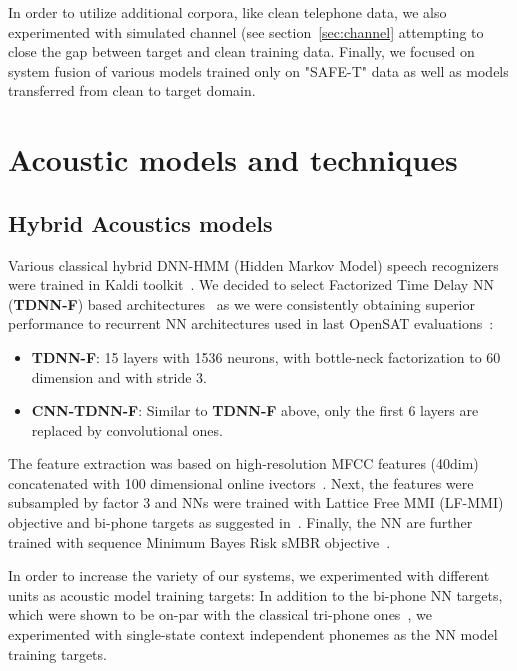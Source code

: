 \documentclass{article}
\begin{document}
In order to utilize additional corpora, like clean telephone data, we  
also experimented with simulated channel (see section~\ref{sec:channel} attempting to close  the  gap
between target and clean training data. Finally, we focused on system fusion of various models trained only on "SAFE-T" data as well as models transferred from clean to target domain.




\section{Acoustic models and techniques}
\label{sec:AM}

\subsection{Hybrid Acoustics models}
Various classical hybrid DNN-HMM (Hidden Markov Model) speech recognizers were trained in Kaldi
toolkit~\cite{povey:ASRU:2011:Kaldi}. We decided to select Factorized
Time Delay NN ({\bf TDNN-F}) based
architectures~\cite{povey:IS:2018:TDNN-F} as we were consistently
obtaining superior performance to recurrent NN architectures used in last OpenSAT evaluations~\cite{karafiat:IS:2018:OpenSAT}:
\begin{itemize}
\item {\bf TDNN-F}: 15 layers with 1536 neurons, with bottle-neck factorization to 60 dimension and with stride 3.
\item {\bf CNN-TDNN-F}: Similar to {\bf TDNN-F} above, only the first 6 layers are replaced by convolutional ones.
\end{itemize}

The feature extraction was based on high-resolution MFCC features (40dim)
concatenated with 100 dimensional online
ivectors~\cite{peddinti:IS:2015:ivec-aspire-online}.
Next, the features were subsampled by factor 3 and NNs were trained with
Lattice Free MMI (LF-MMI) objective and bi-phone targets as suggested
in~\cite{Povey:IS:2019:LF-MMI}. 
Finally, the NN are further trained with sequence Minimum Bayes Risk sMBR
objective~\cite{vesely:IS:2013:DNN_sMBR}.  

In order to increase the variety of our systems, we experimented with
different units as acoustic model training targets:
In addition to the bi-phone NN targets, which were shown to be
on-par with the classical tri-phone ones~\cite{Povey:IS:2019:LF-MMI}, we experimented with single-state context independent phonemes 
as the NN model training targets.
\end{document}
